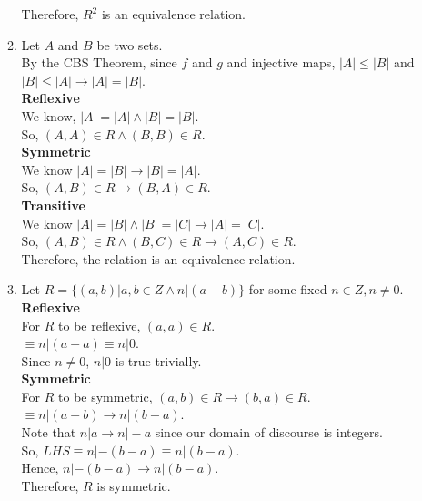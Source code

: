\documentclass[a4paper]{article}
\begin{document}
\begin{enumerate}
\begin{enumerate}
        Therefore, $R^2$ is an equivalence relation.\\

        \item Let $A$ and $B$ be two sets.\\
        By the CBS Theorem, since $f$ and $g$ and injective maps, $|A| \leq |B|$ and $|B| \leq |A| \rightarrow |A| = |B|$.\\

        \textbf{Reflexive}\\
        We know, $|A| = |A| \land |B| = |B|$.\\
        So, $(A, A) \in R \land (B, B) \in R$.\\

        \textbf{Symmetric}\\
        We know $|A| = |B| \rightarrow |B| = |A|$.\\
        So, $(A, B) \in R \rightarrow (B, A) \in R$.\\

        \textbf{Transitive}\\
        We know $|A| = |B| \land |B| = |C| \rightarrow |A| = |C|$.\\
        So, $(A, B) \in R \land (B, C) \in R \rightarrow (A, C) \in R$.\\

        Therefore, the relation is an equivalence relation.\\


        \item Let $R = \{(a, b) | a, b \in Z \land n|(a - b)\}$ for some fixed $n \in Z, n \neq 0$.\\
        
        \textbf{Reflexive}\\
        For $R$ to be reflexive, $(a, a) \in R$.\\
        $\equiv n|(a - a) \equiv n|0$.\\
        Since $n \neq 0$, $n|0$ is true trivially.\\

        \textbf{Symmetric}\\
        For $R$ to be symmetric, $(a, b) \in R \rightarrow (b, a) \in R$.\\
        $\equiv n|(a - b) \rightarrow n|(b - a)$.\\ 

        Note that $n|a \rightarrow n|-a$ since our domain of discourse is integers.\\
        So, $LHS \equiv n|-(b - a) \equiv n|(b - a)$.\\
        Hence, $n|-(b - a) \rightarrow n|(b - a)$.\\
        Therefore, $R$ is symmetric.\\


\end{enumerate}
\end{enumerate}
\end{document}
